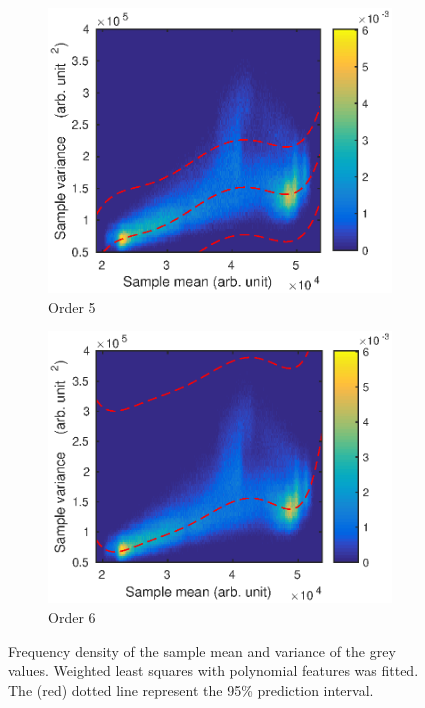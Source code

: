 \documentclass[12pt]{report}
\begin{document}
\begin{figure}
\begin{subfigure}{0.45\textwidth}
		\includegraphics[width=\textwidth]{figures/meanVar/order5.eps}
		\caption{Order 5}
	\end{subfigure}
	\begin{subfigure}{0.45\textwidth}
		\includegraphics[width=\textwidth]{figures/meanVar/order6.eps}
		\caption{Order 6}
	\end{subfigure}
	\caption{Frequency density of the sample mean and variance of the grey values. Weighted least squares with polynomial features was fitted. The (red) dotted line represent the 95\% prediction interval.}
	\label{fig:weightedLS_polynomials}
\end{figure}
\end{document}
